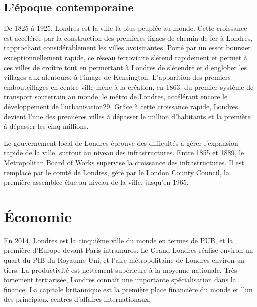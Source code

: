 \documentclass{article}
\begin{document}
\subsection{L'époque contemporaine}
De 1825 à 1925, Londres est la ville la plus peuplée au monde. Cette croissance est accélérée par la construction des premières lignes de chemin de fer à Londres, rapprochant considérablement les villes avoisinantes. Porté par un essor boursier exceptionnellement rapide, ce réseau ferroviaire s'étend rapidement et permet à ces villes de croître tout en permettant à Londres de s'étendre et d'englober les villages aux alentours, à l'image de Kensington. L'apparition des premiers embouteillages en centre-ville mène à la création, en 1863, du premier système de transport souterrain au monde, le métro de Londres, accélérant encore le développement de l'urbanisation29. Grâce à cette croissance rapide, Londres devient l'une des premières villes à dépasser le million d'habitants et la première à dépasser les cinq millions.

Le gouvernement local de Londres éprouve des difficultés à gérer l'expansion rapide de la ville, surtout au niveau des infrastructures. Entre 1855 et 1889, le Metropolitan Board of Works supervise la croissance des infrastructures. Il est remplacé par le comté de Londres, géré par le London County Council, la première assemblée élue au niveau de la ville, jusqu'en 1965.

\newpage
\section{Économie}
En 2014, Londres est la cinquième ville du monde en termes de PUB, et la première d'Europe devant Paris intramuros. Le Grand Londres réalise environ un quart du PIB du Royaume-Uni, et l'aire métropolitaine de Londres environ un tiers. La productivité est nettement supérieure à la moyenne nationale. Très fortement tertiarisée, Londres connaît une importante spécialisation dans la finance. La capitale britannique est la première place financière du monde et l'un des principaux centres d'affaires internationaux. 
\end{document}
